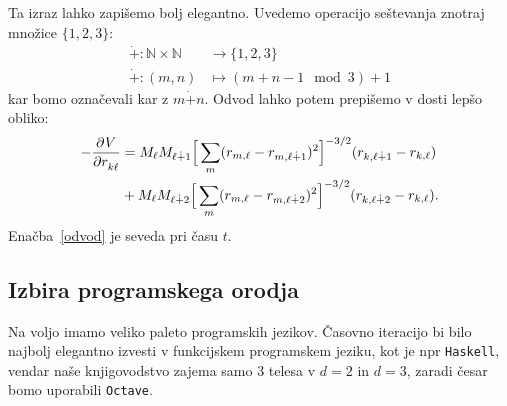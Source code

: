 \documentclass[12pt, a4paper]{article}
\newcommand{\der}[3][]{
    \ensuremath{ \frac{\partial^{#1} #2}{\partial #3^{#1}} }
}
\newcommand{\pl}{
    \ensuremath{\dot{+}}
}
\begin{document}
Ta izraz lahko zapi\v semo bolj elegantno. Uvedemo operacijo se\v stevanja znotraj mno\v zice $\{1,2,3\}$:
\begin{align*}
    \pl : \mathbb{N} \times \mathbb{N} &\to \{1,2,3\} \\
    \pl : (m,n) &\mapsto (m + n - 1 \mod 3) + 1
\end{align*}
kar bomo ozna\v cevali kar z $m\pl n$. Odvod lahko potem prepi\v semo v dosti lep\v so obliko:
\begin{align}
    -\der{V}{r_{k\ell}} &= M_\ell M_{\ell \pl 1} \Big[\sum_m(r_{m,\ell} - r_{m,\ell\pl1})^2\Big]^{-3/2}(r_{k,\ell\pl1}
        - r_{k,\ell}) \notag \\
    &+ M_\ell M_{\ell\pl2}\Big[\sum_m(r_{m,\ell} - r_{m,\ell\pl2})^2\Big]^{-3/2}(r_{k,\ell\pl2} - r_{k,\ell}).
    \label{odvod}
\end{align}
Ena\v cba~\eqref{odvod} je seveda pri \v casu $t$.

\subsection{Izbira programskega orodja}

Na voljo imamo veliko paleto programskih jezikov. \v Casovno iteracijo bi bilo najbolj elegantno izvesti
v funkcijskem programskem jeziku, kot je npr {\tt Haskell}, vendar na\v se knjigovodstvo zajema samo 3
telesa v $d = 2$ in $d = 3$, zaradi \v cesar bomo uporabili {\tt Octave}.
\end{document}
